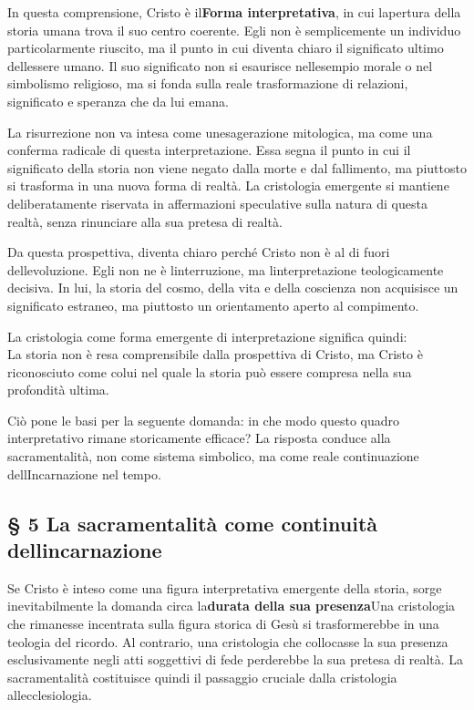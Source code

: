 \documentclass[
]{article}
\begin{document}
In questa comprensione, Cristo è il\textbf{Forma interpretativa}, in cui l\textquotesingle apertura della storia umana trova il suo centro coerente. Egli non è semplicemente un individuo particolarmente riuscito, ma il punto in cui diventa chiaro il significato ultimo dell\textquotesingle essere umano. Il suo significato non si esaurisce nell\textquotesingle esempio morale o nel simbolismo religioso, ma si fonda sulla reale trasformazione di relazioni, significato e speranza che da lui emana.

La risurrezione non va intesa come un\textquotesingle esagerazione mitologica, ma come una conferma radicale di questa interpretazione. Essa segna il punto in cui il significato della storia non viene negato dalla morte e dal fallimento, ma piuttosto si trasforma in una nuova forma di realtà. La cristologia emergente si mantiene deliberatamente riservata in affermazioni speculative sulla natura di questa realtà, senza rinunciare alla sua pretesa di realtà.

Da questa prospettiva, diventa chiaro perché Cristo non è al di fuori dell\textquotesingle evoluzione. Egli non ne è l\textquotesingle interruzione, ma l\textquotesingle interpretazione teologicamente decisiva. In lui, la storia del cosmo, della vita e della coscienza non acquisisce un significato estraneo, ma piuttosto un orientamento aperto al compimento.

La cristologia come forma emergente di interpretazione significa quindi:\\
La storia non è resa comprensibile dalla prospettiva di Cristo, ma Cristo è riconosciuto come colui nel quale la storia può essere compresa nella sua profondità ultima.

Ciò pone le basi per la seguente domanda: in che modo questo quadro interpretativo rimane storicamente efficace? La risposta conduce alla sacramentalità, non come sistema simbolico, ma come reale continuazione dell\textquotesingle Incarnazione nel tempo.

\subsection{\texorpdfstring{\textbf{§ 5 La sacramentalità come continuità dell\textquotesingle incarnazione}}{§ 5 La sacramentalità come continuità dell\textquotesingle incarnazione}}\label{la-sacramentalituxe0-come-continuituxe0-dellincarnazione}

Se Cristo è inteso come una figura interpretativa emergente della storia, sorge inevitabilmente la domanda circa la\textbf{durata della sua presenza}Una cristologia che rimanesse incentrata sulla figura storica di Gesù si trasformerebbe in una teologia del ricordo. Al contrario, una cristologia che collocasse la sua presenza esclusivamente negli atti soggettivi di fede perderebbe la sua pretesa di realtà. La sacramentalità costituisce quindi il passaggio cruciale dalla cristologia all\textquotesingle ecclesiologia.
\end{document}
